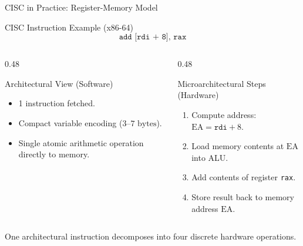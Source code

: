 \documentclass[aspectratio=169,11pt,t]{beamer}
\newcommand{\code}[1]{\texttt{#1}}
\begin{document}
\begin{frame}{CISC in Practice: Register-Memory Model}
\begin{block}{CISC Instruction Example (x86-64)}
$$\code{add [rdi + 8], rax}$$
\end{block}

\vspace{0.1cm}
\begin{columns}[T,onlytextwidth]
\begin{column}{0.48\textwidth}
\begin{block}{Architectural View (Software)}
\begin{itemize}\setlength{\itemsep}{4pt}
  \item 1 instruction fetched.
  \item Compact variable encoding ($3\text{--}7\text{ bytes}$).
  \item Single atomic arithmetic operation directly to memory.
\end{itemize}
\end{block}
\end{column}

\begin{column}{0.48\textwidth}
\begin{block}{Microarchitectural Steps (Hardware)}
\begin{enumerate}\setlength{\itemsep}{2pt}
  \item Compute address: $\text{EA} = \code{rdi} + 8$.
  \item Load memory contents at $\text{EA}$ into ALU.
  \item Add contents of register \code{rax}.
  \item Store result back to memory address $\text{EA}$.
\end{enumerate}
\end{block}
\end{column}
\end{columns}

\vspace{0.3cm}
\normalsize
One architectural instruction decomposes into four discrete hardware operations.
\end{frame}

\end{document}
